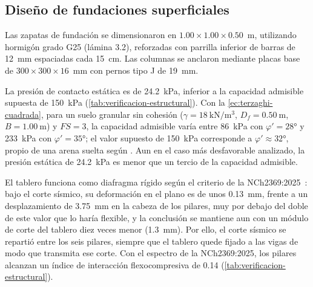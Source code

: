 \subsection{Diseño de fundaciones superficiales}

Las zapatas de fundación se dimensionaron en $\num{1.00} \times \num{1.00} \times \num{0.50}$~\unit{\meter}, utilizando hormigón grado G25 (lámina 3.2), reforzadas con parrilla inferior de barras de \qty{12}{\milli\meter} espaciadas cada \qty{15}{\centi\meter}.
Las columnas se anclaron mediante placas base de $300 \times 300 \times 16$~\unit{\milli\meter} con pernos tipo J de \qty{19}{\milli\meter}.

La presión de contacto estática es de \qty{24.2}{\kilo\pascal}, inferior a la capacidad admisible supuesta de \qty{150}{\kilo\pascal} (\cref{tab:verificacion-estructural}).
Con la \cref{ec:terzaghi-cuadrada}, para un suelo granular sin cohesión ($\gamma = \qty{18}{\kilo\newton\per\cubic\meter}$, $D_f = \qty{0.50}{\meter}$, $B = \qty{1.00}{\meter}$) y $FS = 3$, la capacidad admisible varía entre \qty{86}{\kilo\pascal} con $\varphi' = \ang{28}$ y \qty{233}{\kilo\pascal} con $\varphi' = \ang{35}$; el valor supuesto de \qty{150}{\kilo\pascal} corresponde a $\varphi' \approx \ang{32}$, propio de una arena suelta según \textcite{das2015fundamentos}.
Aun en el caso más desfavorable analizado, la presión estática de \qty{24.2}{\kilo\pascal} es menor que un tercio de la capacidad admisible.

El tablero funciona como diafragma rígido según el criterio de la NCh2369:2025~\parencite{inn2025nch2369}: bajo el corte sísmico, su deformación en el plano es de unos \qty{0.13}{\milli\meter}, frente a un desplazamiento de \qty{3.75}{\milli\meter} en la cabeza de los pilares, muy por debajo del doble de este valor que lo haría flexible, y la conclusión se mantiene aun con un módulo de corte del tablero diez veces menor (\qty{1.3}{\milli\meter}).
Por ello, el corte sísmico se repartió entre los seis pilares, siempre que el tablero quede fijado a las vigas de modo que transmita ese corte.
Con el espectro de la NCh2369:2025, los pilares alcanzan un índice de interacción flexocompresiva de \num{0.14} (\cref{tab:verificacion-estructural}).

